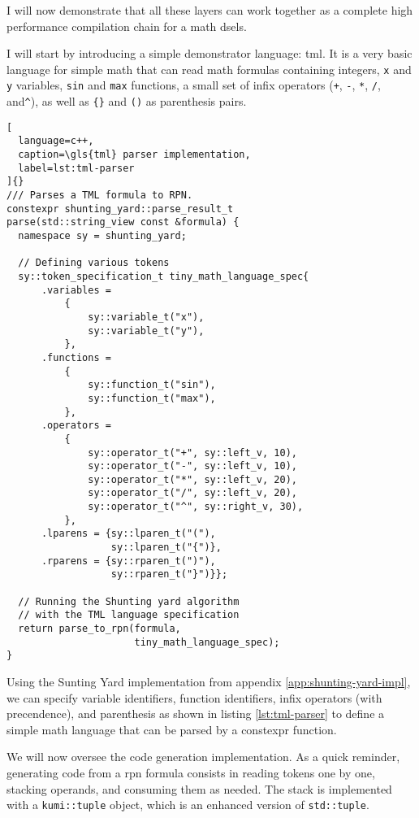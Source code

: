 \documentclass[../main]{subfiles}
\begin{document}
I will now demonstrate that all these layers can work together
as a complete high performance compilation chain for a math \glspl{dsel}.

I will start by introducing a simple demonstrator language: \gls{tml}.
It is a very basic language for simple math that can read math formulas
containing integers, \lstinline{x} and \lstinline{y} variables,
\lstinline{sin} and \lstinline{max} functions, a small set of infix operators
(\lstinline{+}, \lstinline{-}, \lstinline{*}, \lstinline{/}, and\lstinline{^}),
as well as \lstinline|{}| and \lstinline{()} as parenthesis pairs.

\begin{lstlisting}[
  language=c++,
  caption=\gls{tml} parser implementation,
  label=lst:tml-parser
]{}
/// Parses a TML formula to RPN.
constexpr shunting_yard::parse_result_t
parse(std::string_view const &formula) {
  namespace sy = shunting_yard;

  // Defining various tokens
  sy::token_specification_t tiny_math_language_spec{
      .variables =
          {
              sy::variable_t("x"),
              sy::variable_t("y"),
          },
      .functions =
          {
              sy::function_t("sin"),
              sy::function_t("max"),
          },
      .operators =
          {
              sy::operator_t("+", sy::left_v, 10),
              sy::operator_t("-", sy::left_v, 10),
              sy::operator_t("*", sy::left_v, 20),
              sy::operator_t("/", sy::left_v, 20),
              sy::operator_t("^", sy::right_v, 30),
          },
      .lparens = {sy::lparen_t("("),
                  sy::lparen_t("{")},
      .rparens = {sy::rparen_t(")"),
                  sy::rparen_t("}")}};

  // Running the Shunting yard algorithm
  // with the TML language specification
  return parse_to_rpn(formula,
                      tiny_math_language_spec);
}
\end{lstlisting}

Using the Sunting Yard implementation from
appendix \ref{app:shunting-yard-impl}, we can specify variable identifiers,
function identifiers, infix operators (with precendence), and parenthesis
as shown in listing \ref{lst:tml-parser} to define a simple math language
that can be parsed by a \gls{constexpr} function.

We will now oversee the code generation implementation.
As a quick reminder, generating code from a \gls{rpn} formula
consists in reading tokens one by one, stacking operands, and consuming
them as needed. The stack is implemented with a \lstinline{kumi::tuple} object,
which is an enhanced version of \lstinline{std::tuple}.
\end{document}
